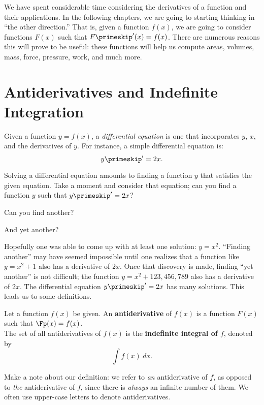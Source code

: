 We have spent considerable time considering the derivatives of a function and their applications. In the following chapters, we are going to starting thinking in ``the other direction.'' That is, given a function $f(x)$, we are going to consider functions $F(x)$ such that $F\primeskip'(x) = f(x)$. There are numerous reasons this will prove to be useful: these functions will help us compute areas, volumes, mass, force, pressure, work, and much more.



\section{Antiderivatives and Indefinite Integration}\label{sec:antider}

Given a function $y=f(x)$, a \textit{differential equation} is one that incorporates $y$, $x$, and the derivatives of $y$. For instance, a simple differential equation is: $$y\primeskip' = 2x.$$

Solving a differential equation amounts to finding a function $y$ that satisfies the given equation. Take a moment and consider that equation; can you find a function $y$ such that $y\primeskip' = 2x$?

Can you find another?

And yet another?

Hopefully one was able to come up with at least one solution: $y = x^2$. ``Finding another'' may have seemed impossible until one realizes that a function like $y=x^2+1$ also has a derivative of $2x$. Once that discovery is made, finding ``yet another'' is not difficult; the function $y = x^2 + 123,456,789$ also has a derivative of $2x$. The differential equation $y\primeskip' = 2x$ has many solutions. This leads us to some definitions.

{Let a function $f(x)$ be given. An \textbf{antiderivative} of $f(x)$ is a function $F(x)$ such that $\Fp(x) = f(x)$.\\

The set of all antiderivatives of $f(x)$ is the \textbf{indefinite integral of $f$}, denoted by $$\int f(x) \ dx.$$
}

Make a note about our definition: we refer to \textit{an} antiderivative of $f$, as opposed to \textit{the} antiderivative of $f$, since there is \textit{always} an infinite number of them. We often use upper-case letters to denote antiderivatives.

